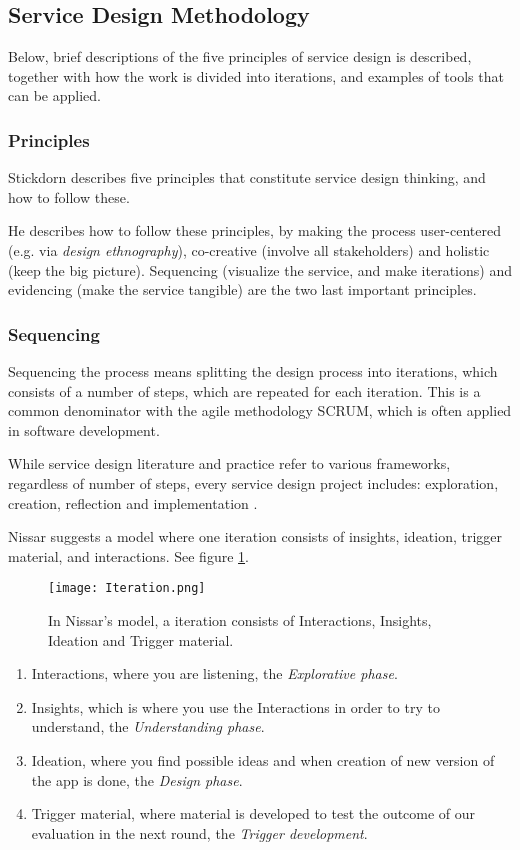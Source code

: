 \subsection{Service Design Methodology}

Below, brief descriptions of the five principles of service design is described, together with how the work is divided into iterations, and examples of tools that can be applied.

\subsubsection{Principles}
Stickdorn \cite{stickdorn} describes five principles that constitute service design thinking, and how to follow these.

He describes how to follow these principles, by making the process user-centered (e.g. via \textit{design ethnography}), co-creative (involve all stakeholders) and holistic (keep the big picture). Sequencing (visualize the service, and make iterations) and evidencing (make the service tangible) are the two last important principles.

\subsubsection{Sequencing}
Sequencing the process means splitting the design process into iterations, which consists of a number of steps, which are repeated for each iteration. This is a common denominator with the agile methodology SCRUM, which is often applied in software development.

While service design literature and practice refer to various frameworks, regardless of number of steps, every service design project includes: exploration, creation, reflection and implementation \cite{stickdorn}.

Nissar \cite{expedition-mondial} suggests a model where one iteration consists of insights, ideation, trigger material, and interactions. See figure \ref{fig:iteration}.

\begin{figure}[h]
    \centering
    \texttt{[image: Iteration.png]}
    \caption{In Nissar's model, a iteration consists of Interactions, Insights, Ideation and Trigger material.}
    \label{fig:iteration}
\end{figure}

\begin{enumerate}
\item Interactions, where you are listening, the \textit{Explorative phase}.
\item Insights, which is where you use the Interactions in order to try to understand, the \textit{Understanding phase}. %
\item Ideation, where you find possible ideas and when creation of new version of the app is done, the \textit{Design phase}.
\item Trigger material, where material is developed to test the outcome of our evaluation in the next round, the \textit{Trigger development}.
\end{enumerate}

